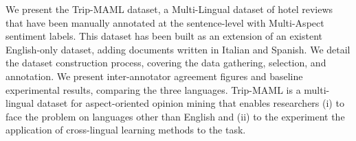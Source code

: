 We present the Trip-MAML dataset, a Multi-Lingual dataset of hotel reviews that have been manually annotated at the sentence-level with Multi-Aspect sentiment labels. This dataset has been built as an extension of an existent English-only dataset, adding documents written in Italian and Spanish. We detail the dataset construction process, covering the data gathering, selection, and annotation. We present inter-annotator agreement figures and baseline experimental results, comparing the three languages. Trip-MAML is a multi-lingual dataset for aspect-oriented opinion mining that enables researchers (i) to face the problem on languages other than English and (ii) to the experiment the application of cross-lingual learning methods to the task.
